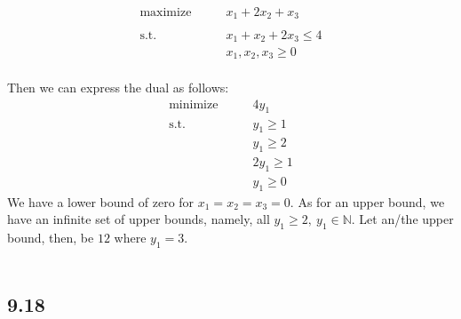 \documentclass[letterpaper,12pt]{article}
\theoremstyle{definition}
\begin{document}
\begin{align*}
\underset{}{\text{maximize}} \qquad &x_1 + 2x_2 + x_3\\
\\ \text{s.t.}  \qquad &x_1 + x_2 + 2x_3 \leq 4
\\  \qquad	&x_1,x_2,x_3 \geq 0
\end{align*}
\\ Then we can express the dual as follows:
\begin{align*}
\underset{}{\text{minimize}} \qquad &4y_1
\\ \text{s.t.} \qquad &y_1 \geq 1\\ &y_1 \geq 2 \\&2y_1 \geq 1\\&y_1 \geq 0
\end{align*}
We have a lower bound of zero for $x_1 = x_2 = x_3 = 0$. As for an upper bound, we have an infinite set of upper bounds, namely, all $y_1 \geq 2, ~ y_1 \in \mathbb{N}$. Let an/the upper bound, then, be $12$ where $y_1 = 3$.
\\
\\

\subsection*{9.18}
\end{document}
